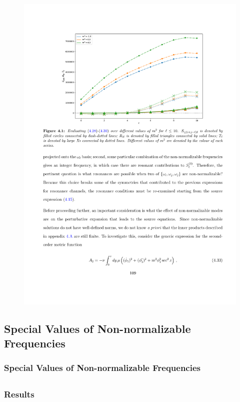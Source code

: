 \documentclass[mathserif,10pt]{beamer}
\begin{document}
{\begin{overlayarea}{\textwidth}{0.25\textheight}
{\begin{figure}
  \includegraphics[scale=0.55]{norm} 
  \end{figure}
  }
  \end{overlayarea}
}


\subsection{Special Values of Non-normalizable Frequencies}
\frame
{
  \frametitle{Special Values of Non-normalizable Frequencies}
}


\subsection*{}
\frame
{
  \frametitle{Results}
}
\end{document}
